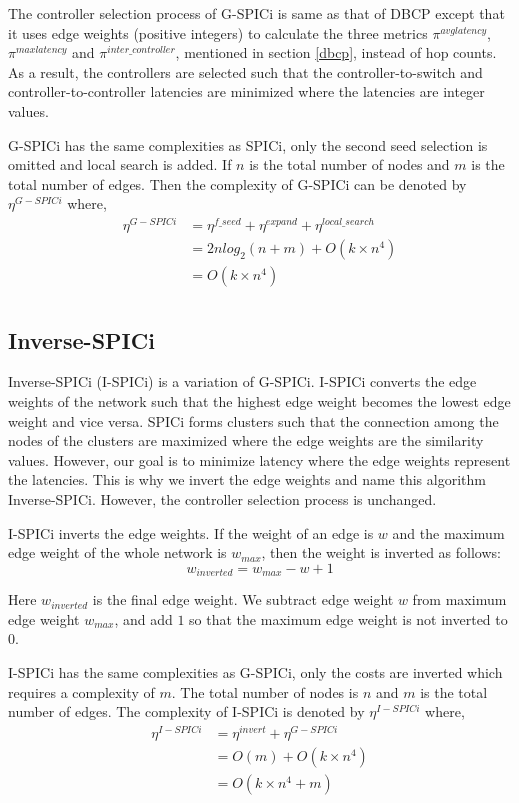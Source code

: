 \documentclass[times]{dacauth}
\begin{document}
\smallskip
The controller selection process of G-SPICi is same as that of DBCP except that it uses edge weights (positive integers) to calculate the three metrics $\pi^{avglatency}$, $\pi^{maxlatency}$ and $\pi^{inter\_controller}$, mentioned in section \ref{dbcp}, instead of hop counts. As a result, the controllers are selected such that the controller-to-switch and controller-to-controller latencies are minimized where the latencies are integer values.


\smallskip
G-SPICi has the same complexities as SPICi, only the second seed selection is omitted and local search is added. If $n$ is the total number of nodes and $m$ is the total number of edges. Then the complexity of G-SPICi can be denoted by $\eta^{G-SPICi}$ where,
\begin{equation}
\begin{split}
\eta^{G-SPICi} &= \eta^{f\_seed} + \eta^{expand} + \eta^{local\_search}\\
&= 2nlog_2(n+m)+O(k\times n^4)\\
&= O(k\times n^4)\\
\end{split}
\end{equation}

\subsection{Inverse-SPICi}

Inverse-SPICi (I-SPICi) is a variation of G-SPICi. I-SPICi converts the edge weights of the network such that the highest edge weight becomes the lowest edge weight and vice versa. SPICi forms clusters such that the connection among the nodes of the clusters are maximized where the edge weights are the similarity values. However, our goal is to minimize latency where the edge weights represent the latencies. This is why we invert the edge weights and name this algorithm Inverse-SPICi. However, the controller selection process is unchanged.

\smallskip
I-SPICi inverts the edge weights. If the weight of an edge is $w$ and the maximum edge weight of the whole network is $w_{max}$, then the weight is inverted as follows:
\[
w_{inverted} = w_{max} - w + 1
\]

Here $w_{inverted}$ is the final edge weight. We subtract edge weight $w$ from maximum edge weight $w_{max}$, and add $1$ so that the maximum edge weight is not inverted to $0$.

\smallskip
I-SPICi has the same complexities as G-SPICi, only the costs are inverted which requires a complexity of $m$. The total number of nodes is $n$ and $m$ is the total number of edges. The complexity of I-SPICi is denoted by $\eta^{I-SPICi}$ where,
\begin{equation}
\begin{split}
\eta^{I-SPICi} &= \eta^{invert} + \eta^{G-SPICi}\\
&= O(m)+O(k\times n^4)\\
&= O(k\times n^4 + m)\\
\end{split}
\end{equation}
\end{document}
